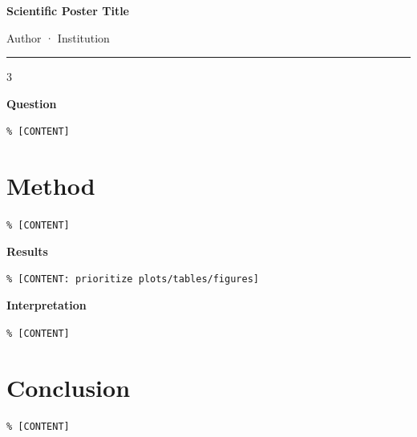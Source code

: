 \documentclass{article}
\begin{document}
{\fontsize{38}{44}\selectfont\bfseries Scientific Poster Title\par}
{\fontsize{18}{22}\selectfont Author · Institution\par}\vspace{1em}\hrule\vspace{1em}
\begin{multicols}{3}
{\fontsize{24}{28}\selectfont\bfseries\color{Accent} Question\par}\fontsize{15}{19}\selectfont\texttt{\% [CONTENT]}
\section*{Method}\texttt{\% [CONTENT]}
\columnbreak
{\fontsize{24}{28}\selectfont\bfseries\color{Accent} Results\par}\texttt{\% [CONTENT: prioritize plots/tables/figures]}
\columnbreak
{\fontsize{24}{28}\selectfont\bfseries\color{Accent} Interpretation\par}\texttt{\% [CONTENT]}
\section*{Conclusion}\texttt{\% [CONTENT]}
\end{multicols}
\end{document}

